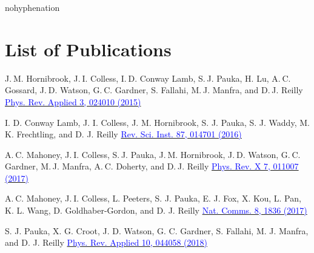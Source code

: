 \begin{hyphenrules}{nohyphenation}
  \begin{sloppypar}
    \tableofcontents
    \newpage
    \listoffigures
    \newpage
    \listoftables
    \newpage
    \chapter*{List of Publications}
      \makeatletter
      \let\old@parskip=\parskip
      \setlength{\parskip}{2em}
      \makeatother

      {J. M. Hornibrook, J. I. Colless, I. D. Conway Lamb, S. J. Pauka, H. Lu, A. C. Gossard, J. D. Watson, G. C. Gardner, S. Fallahi, M. J. Manfra, and D. J. Reilly}
      {\href{https://doi.org/\detokenize{10.1103/PhysRevApplied.3.024010}}{\textcolor{blue}{Phys. Rev. Applied 3, 024010 (2015)}}}

      {I. D. Conway Lamb, J. I. Colless, J. M. Hornibrook, S. J. Pauka, S. J. Waddy, M. K. Frechtling, and D. J. Reilly}
      {\href{https://doi.org/\detokenize{10.1063/1.4939094}}{\textcolor{blue}{Rev. Sci. Inst. 87, 014701 (2016)}}}

      {A. C. Mahoney, J. I. Colless, S. J. Pauka, J. M. Hornibrook, J. D. Watson, G. C. Gardner, M. J. Manfra, A. C. Doherty, and D. J. Reilly}
      {\href{https://doi.org/\detokenize{10.1103/PhysRevX.7.011007}}{\textcolor{blue}{Phys. Rev. X 7, 011007 (2017)}}}

      {A. C. Mahoney, J. I. Colless, L. Peeters, S. J. Pauka, E. J. Fox, X. Kou, L. Pan, K. L. Wang, D. Goldhaber-Gordon, and D. J. Reilly}
      {\href{https://doi.org/\detokenize{10.1038/s41467-017-01984-5}}{\textcolor{blue}{Nat. Comms. 8, 1836 (2017)}}}

      {S. J. Pauka, X. G. Croot, J. D. Watson, G. C. Gardner, S. Fallahi, M. J. Manfra, and D. J. Reilly}
      {\href{https://doi.org/\detokenize{10.1103/PhysRevApplied.10.044058}}{\textcolor{blue}{Phys. Rev. Applied 10, 044058 (2018)}}}


\end{sloppypar}
\end{hyphenrules}
